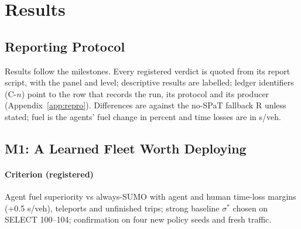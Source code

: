 \section{Results}\label{sec:results}
\subsection{Reporting Protocol}
Results follow the milestones. Every registered verdict is quoted from its report script, with the panel and level; descriptive results
are labelled; ledger identifiers (C-$n$) point to the row that records the run, its protocol and its producer
(Appendix~\ref{app:repro}). Differences are against the no-SPaT fallback R unless stated; fuel is the agents' fuel change in percent and
time losses are in s/veh.
\subsection{M1: A Learned Fleet Worth Deploying}\label{sec:m1}
\paragraph{Criterion (registered)} Agent fuel superiority vs always-SUMO with agent and human time-loss margins (+0.5 s/veh),
teleports and unfinished trips; strong baseline $\sigma^*$ chosen on SELECT 100--104; confirmation on four new policy seeds and fresh traffic.
